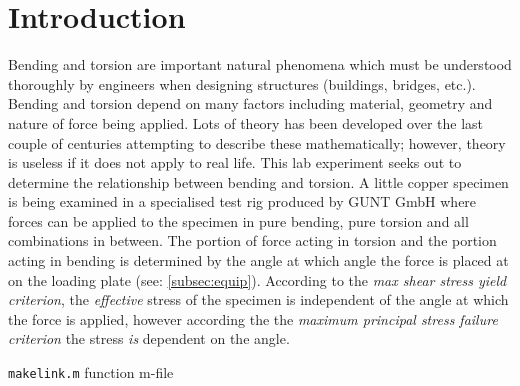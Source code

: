 \documentclass[authoryear]{tex/labreport}
\subtitle{Combined Bending \& Torsion}
\date{\DTMusedate{submitdate}}
\begin{document}
\newcolumntype{Z}{S[round-mode=places, round-precision=3,table-number-alignment = center] }

\thispagestyle{empty} %
\tableofcontents
\clearpage

\pagestyle{myheadings} %

\section{Introduction}
\label{sec:intro}

Bending and torsion are important natural phenomena which must be understood thoroughly by engineers when designing structures (buildings, bridges, etc.). Bending and torsion depend on many factors including material, geometry and nature of force being applied. Lots of theory has been developed over the last couple of centuries attempting to describe these mathematically; however, theory is useless if it does not apply to real life. This lab experiment seeks out to determine the relationship between bending and torsion. A little copper specimen is being examined in a specialised test rig produced by GUNT GmbH where forces can be applied to the specimen in pure bending, pure torsion and all combinations in between. The portion of force acting in torsion and the portion acting in bending is determined by the angle at which angle the force is placed at on the loading plate (see: \cref{subsec:equip}). According to the \textit{max shear stress yield criterion}, the \textit{effective} stress of the specimen is independent of the angle at which the force is applied,  however according the the \textit{maximum principal stress failure criterion} the stress \textit{is} dependent on the angle.
\begin{longlisting}
    \caption{\texttt{makelink.m} function m-file}
    \inputminted[bgcolor=lightgray!30,escapeinside=££]{matlab}{code/makelink.m}
    \label{lst:makelink}
\end{longlisting}
\end{document}
